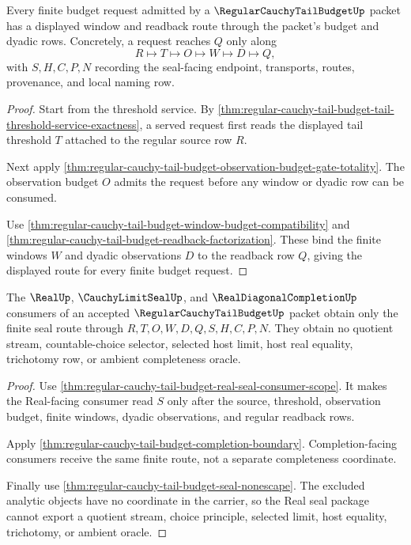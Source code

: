 \begin{theorem}
\label{thm:regularcauchytailbudget-budget-window-readback-totality}
Every finite budget request admitted by a $\RegularCauchyTailBudgetUp$ packet has a displayed window and readback route through the packet's budget and dyadic rows. Concretely, a request reaches $Q$ only along
$$
R \longmapsto T \longmapsto O \longmapsto W \longmapsto D \longmapsto Q,
$$
with $S,H,C,P,N$ recording the seal-facing endpoint, transports, routes, provenance, and local naming row.
\end{theorem}
\begin{proof}
Start from the threshold service. By \autoref{thm:regular-cauchy-tail-budget-tail-threshold-service-exactness}, a served request first reads the displayed tail threshold $T$ attached to the regular source row $R$.

Next apply \autoref{thm:regular-cauchy-tail-budget-observation-budget-gate-totality}. The observation budget $O$ admits the request before any window or dyadic row can be consumed.

Use \autoref{thm:regular-cauchy-tail-budget-window-budget-compatibility} and \autoref{thm:regular-cauchy-tail-budget-readback-factorization}. These bind the finite windows $W$ and dyadic observations $D$ to the readback row $Q$, giving the displayed route for every finite budget request.
\end{proof}

\begin{theorem}
\label{thm:regularcauchytailbudget-real-seal-nonescape-package}
The $\RealUp$, $\CauchyLimitSealUp$, and $\RealDiagonalCompletionUp$ consumers of an accepted $\RegularCauchyTailBudgetUp$ packet obtain only the finite seal route through $R,T,O,W,D,Q,S,H,C,P,N$. They obtain no quotient stream, countable-choice selector, selected host limit, host real equality, trichotomy row, or ambient completeness oracle.
\end{theorem}
\begin{proof}
Use \autoref{thm:regular-cauchy-tail-budget-real-seal-consumer-scope}. It makes the Real-facing consumer read $S$ only after the source, threshold, observation budget, finite windows, dyadic observations, and regular readback rows.

Apply \autoref{thm:regular-cauchy-tail-budget-completion-boundary}. Completion-facing consumers receive the same finite route, not a separate completeness coordinate.

Finally use \autoref{thm:regular-cauchy-tail-budget-seal-nonescape}. The excluded analytic objects have no coordinate in the carrier, so the Real seal package cannot export a quotient stream, choice principle, selected limit, host equality, trichotomy, or ambient oracle.
\end{proof}


